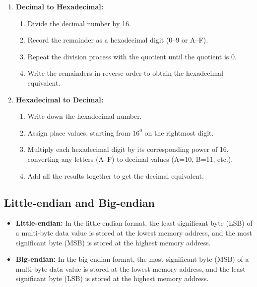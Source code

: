 \begin{process}
\begin{enumerate}
    \item \textbf{Decimal to Hexadecimal:}
    \begin{enumerate}
        \item Divide the decimal number by 16.
        \item Record the remainder as a hexadecimal digit (0–9 or A–F).
        \item Repeat the division process with the quotient until the quotient is 0.
        \item Write the remainders in reverse order to obtain the hexadecimal equivalent.
    \end{enumerate}
    
    \item \textbf{Hexadecimal to Decimal:}
    \begin{enumerate}
        \item Write down the hexadecimal number.
        \item Assign place values, starting from $16^0$ on the rightmost digit.
        \item Multiply each hexadecimal digit by its corresponding power of 16, converting any letters (A–F) to decimal values (A=10, B=11, etc.).
        \item Add all the results together to get the decimal equivalent.
    \end{enumerate}
\end{enumerate}
\end{process}

\subsection{Little-endian and Big-endian}
\begin{definition}
\begin{itemize}
    \item \textbf{Little-endian:} In the little-endian format, the least significant byte (LSB) of a multi-byte data value is stored at the lowest memory address, and the most significant byte (MSB) is stored at the highest memory address.

    \item \textbf{Big-endian:} In the big-endian format, the most significant byte (MSB) of a multi-byte data value is stored at the lowest memory address, and the least significant byte (LSB) is stored at the highest memory address.
\end{itemize}
\end{definition}

